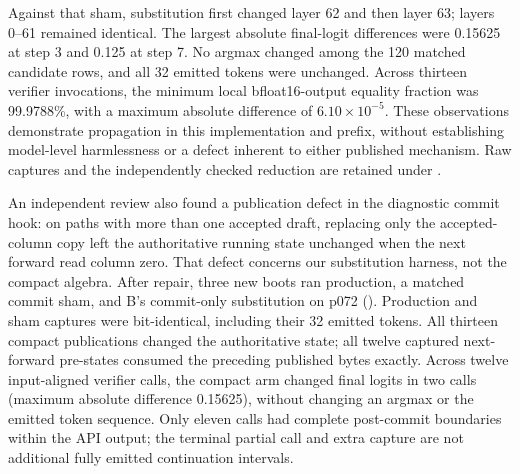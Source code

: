 \documentclass[conference]{IEEEtran}
\begin{document}
Against that sham, substitution first changed layer 62 and then layer 63; layers 0--61 remained identical. The largest absolute final-logit differences were 0.15625 at step 3 and 0.125 at step 7. No argmax changed among the 120 matched candidate rows, and all 32 emitted tokens were unchanged. Across thirteen verifier invocations, the minimum local bfloat16-output equality fraction was 99.9788\%, with a maximum absolute difference of $6.10\times10^{-5}$. These observations demonstrate propagation in this implementation and prefix, without establishing model-level harmlessness or a defect inherent to either published mechanism. Raw captures and the independently checked reduction are retained under .

An independent review also found a publication defect in the diagnostic commit hook: on paths with more than one accepted draft, replacing only the accepted-column copy left the authoritative running state unchanged when the next forward read column zero. That defect concerns our substitution harness, not the compact algebra. After repair, three new boots ran production, a matched commit sham, and B's commit-only substitution on p072 (). Production and sham captures were bit-identical, including their 32 emitted tokens. All thirteen compact publications changed the authoritative state; all twelve captured next-forward pre-states consumed the preceding published bytes exactly. Across twelve input-aligned verifier calls, the compact arm changed final logits in two calls (maximum absolute difference 0.15625), without changing an argmax or the emitted token sequence. Only eleven calls had complete post-commit boundaries within the API output; the terminal partial call and extra capture are not additional fully emitted continuation intervals.
\end{document}
